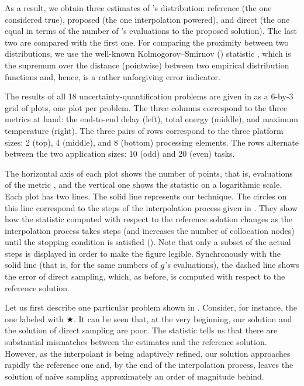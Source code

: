 As a result, we obtain three estimates of \g's distribution: reference (the one
considered true), proposed (the one interpolation powered), and direct (the one
equal in terms of the number of \g's evaluations to the proposed solution). The
last two are compared with the first one. For comparing the proximity between
two distributions, we use the well-known Kolmogorov--Smirnov () statistic
\cite{rao2002}, which is the supremum over the distance (pointwise) between two
empirical distribution functions and, hence, is a rather unforgiving error
indicator.


The results of all 18 uncertainty-quantification problems are given in
 as a 6-by-3 grid of plots, one plot per problem. The three
columns correspond to the three metrics at hand: the end-to-end delay (left),
total energy (middle), and maximum temperature (right). The three pairs of rows
correspond to the three platform sizes: 2 (top), 4 (middle), and 8 (bottom)
processing elements. The rows alternate between the two application sizes: 10
(odd) and 20 (even) tasks.

The horizontal axis of each plot shows the number of points, that is,
evaluations of the metric \g, and the vertical one shows the  statistic
on a logarithmic scale. Each plot has two lines. The solid line represents our
technique. The circles on this line correspond to the steps of the interpolation
process given in . They show how the  statistic
computed with respect to the reference solution changes as the interpolation
process takes steps (and increases the number of collocation nodes) until the
stopping condition is satisfied (). Note that only a subset of
the actual steps is displayed in order to make the figure legible. Synchronously
with the solid line (that is, for the same numbers of $g$'s evaluations), the
dashed line shows the error of direct sampling, which, as before, is computed
with respect to the reference solution.

Let us first describe one particular problem shown in . Consider,
for instance, the one labeled with $\bigstar$. It can be seen that, at the very
beginning, our solution and the solution of direct sampling are poor. The
 statistic tells us that there are substantial mismatches between the
estimates and the reference solution. However, as the interpolant is being
adaptively refined, our solution approaches rapidly the reference one and, by
the end of the interpolation process, leaves the solution of na\"{i}ve sampling
approximately an order of magnitude behind.

